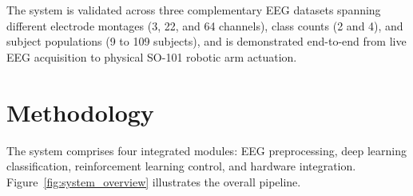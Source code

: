 \documentclass[12pt, a4paper]{article}
\begin{document}
The system is validated across three complementary EEG datasets spanning different electrode montages (3, 22, and 64 channels), class counts (2 and 4), and subject populations (9 to 109 subjects), and is demonstrated end-to-end from live EEG acquisition to physical SO-101 robotic arm actuation.

\section{Methodology}

The system comprises four integrated modules: EEG preprocessing, deep learning classification, reinforcement learning control, and hardware integration. Figure~\ref{fig:system_overview} illustrates the overall pipeline.
\end{document}
